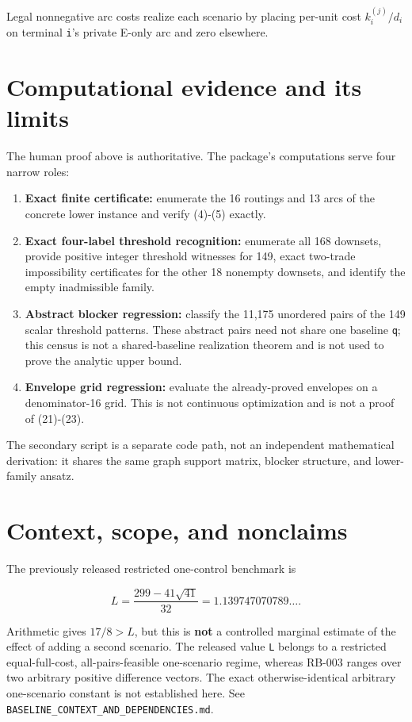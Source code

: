 \documentclass[
  11pt,
]{article}
\providecommand{\tightlist}{%
  \setlength{\itemsep}{0pt}\setlength{\parskip}{0pt}}
\begin{document}
Legal nonnegative arc costs realize each scenario by placing per-unit
cost \(k_i^{(j)}/d_i\) on terminal \texttt{i}'s private E-only arc and
zero elsewhere.

\section{Computational evidence and its
limits}\label{computational-evidence-and-its-limits}

The human proof above is authoritative. The package's computations serve
four narrow roles:

\begin{enumerate}
\def\labelenumi{\arabic{enumi}.}
\tightlist
\item
  \textbf{Exact finite certificate:} enumerate the 16 routings and 13
  arcs of the concrete lower instance and verify (4)-(5) exactly.
\item
  \textbf{Exact four-label threshold recognition:} enumerate all 168
  downsets, provide positive integer threshold witnesses for 149, exact
  two-trade impossibility certificates for the other 18 nonempty
  downsets, and identify the empty inadmissible family.
\item
  \textbf{Abstract blocker regression:} classify the 11,175 unordered
  pairs of the 149 scalar threshold patterns. These abstract pairs need
  not share one baseline \texttt{q}; this census is not a
  shared-baseline realization theorem and is not used to prove the
  analytic upper bound.
\item
  \textbf{Envelope grid regression:} evaluate the already-proved
  envelopes on a denominator-16 grid. This is not continuous
  optimization and is not a proof of (21)-(23).
\end{enumerate}

The secondary script is a separate code path, not an independent
mathematical derivation: it shares the same graph support matrix,
blocker structure, and lower-family ansatz.

\section{Context, scope, and
nonclaims}\label{context-scope-and-nonclaims}

The previously released restricted one-control benchmark is

\[
L=\frac{299-41\sqrt{41}}{32}
=1.139747070789\ldots.
\]

Arithmetic gives \(17/8>L\), but this is \textbf{not} a controlled
marginal estimate of the effect of adding a second scenario. The
released value \texttt{L} belongs to a restricted equal-full-cost,
all-pairs-feasible one-scenario regime, whereas RB-003 ranges over two
arbitrary positive difference vectors. The exact otherwise-identical
arbitrary one-scenario constant is not established here. See
\texttt{BASELINE\_CONTEXT\_AND\_DEPENDENCIES.md}.
\end{document}
